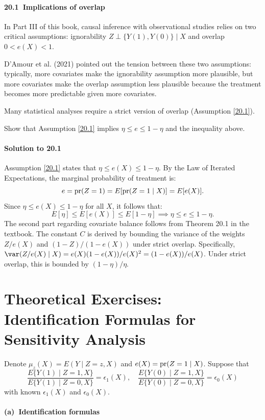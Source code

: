 \documentclass[krantz1]{krantz}
\def\pr{\textup{pr}}
\def\ind{\perp}
\def\Paragraph{\paragraph}
\begin{document}
 \Paragraph{20.1~Implications of overlap}\label{hw::overlap-implications}

In Part III of this book, causal inference with observational studies relies on two critical assumptions: ignorability $Z\ind \{Y(1), Y(0)\} \mid X$ and overlap $0 < e(X) < 1$.

D'Amour et al. (2021) pointed out the tension between these two assumptions: typically, more covariates make the ignorability assumption more plausible, but more covariates make the overlap assumption less plausible because the treatment becomes more predictable given more covariates.

Many statistical analyses require a strict version of overlap (Assumption \ref{20.1}).

Show that Assumption \ref{20.1} implies $\eta \leq e \leq 1 - \eta$ and the inequality above.

\Paragraph{Solution to 20.1}

Assumption \ref{20.1} states that $\eta \leq e(X) \leq 1 - \eta$.
By the Law of Iterated Expectations, the marginal probability of treatment is:
\begin{equation*}
    e = \pr(Z=1) = E[ \pr(Z=1 \mid X) ] = E[ e(X) ].
\end{equation*}
Since $\eta \leq e(X) \leq 1 - \eta$ for all $X$, it follows that:
\begin{equation*}
    E[\eta] \leq E[e(X)] \leq E[1 - \eta] \implies \eta \leq e \leq 1 - \eta.
\end{equation*}
The second part regarding covariate balance follows from Theorem 20.1 in the textbook. The constant $C$ is derived by bounding the variance of the weights $Z/e(X)$ and $(1-Z)/(1-e(X))$ under strict overlap. Specifically, $\var(Z/e(X) \mid X) = e(X)(1-e(X))/e(X)^2 = (1-e(X))/e(X)$. Under strict overlap, this is bounded by $(1-\eta)/\eta$.

\section{Theoretical Exercises: Identification Formulas for Sensitivity Analysis}

Denote $\mu_z(X) = E(Y \mid Z=z, X)$ and $e(X) = \pr(Z=1 \mid X)$.
Suppose that
$$
\frac{E\{Y(1) \mid Z=1, X\}}{E\{Y(1) \mid Z=0, X\}} = \epsilon_1(X), \quad
\frac{E\{Y(0) \mid Z=1, X\}}{E\{Y(0) \mid Z=0, X\}} = \epsilon_0(X)
$$
with known $\epsilon_1(X)$ and $\epsilon_0(X)$.

 \Paragraph{(a)~Identification formulas}\label{hw::sensitivity-id}
\end{document}
